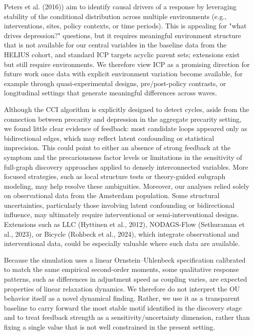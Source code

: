 \documentclass[
]{article}
\begin{document}
Peters et al.
(2016)\textcolor{BrickRed}{) aim to identify causal drivers of a response by leveraging stability of the conditional distribution across multiple environments (e.g., interventions, sites, policy contexts, or time periods). This is appealing for "what drives depression?" questions, but it requires meaningful environment structure that is not available for our central variables in the baseline data from the HELIUS cohort, and standard ICP targets acyclic parent sets; extensions exist but still require environments. We therefore view ICP as a promising direction for future work once data with explicit environment variation become available, for example through quasi-experimental designs, pre/post-policy contrasts, or longitudinal settings that generate meaningful differences across waves.}

Although the CCI algorithm is explicitly designed to detect cycles,
aside from the connection between precarity and depression in the
aggregate precarity setting, we found little clear evidence of feedback:
most candidate loops appeared only as bidirectional edges, which may
reflect latent confounding or statistical imprecision. This could point
to either an absence of strong feedback at the symptom and the
precariousness factor levels or limitations in the sensitivity of
full-graph discovery approaches applied to densely interconnected
variables. More focused strategies, such as local structure tests or
theory-guided subgraph modeling, may help resolve these ambiguities.
Moreover, our analyses relied solely on observational data from the
Amsterdam population. Some structural uncertainties, particularly those
involving latent confounding or bidirectional influence, may ultimately
require interventional or semi-interventional designs. Extensions such
as LLC (Hyttinen et al., 2012), NODAGS-Flow (Sethuraman et al., 2023),
or Bicycle (Rohbeck et al., 2024), which integrate observational and
interventional data, could be especially valuable where such data are
available.

\textcolor{BrickRed}{Because the simulation uses a linear Ornstein–Uhlenbeck specification calibrated to match the same empirical second-order moments, some qualitative response patterns, such as differences in adjustment speed as coupling varies, are expected properties of linear relaxation dynamics. We therefore do not interpret the OU behavior itself as a novel dynamical finding. Rather, we use it as a transparent baseline to carry forward the most stable motif identified in the discovery stage and to treat feedback strength as a sensitivity/uncertainty dimension, rather than fixing a single value that is not well constrained in the present setting.}
\end{document}
